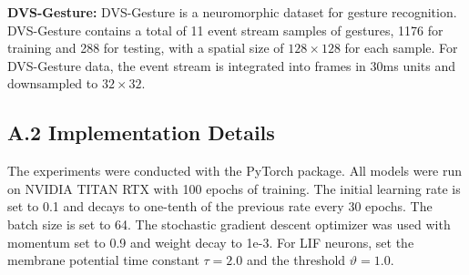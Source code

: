 \documentclass[letterpaper]{article} %
\begin{document}
\textbf{DVS-Gesture:} DVS-Gesture \cite{DVS-Gesture} is a neuromorphic dataset for gesture recognition. DVS-Gesture contains a total of 11 event stream samples of gestures, 1176 for training and 288 for testing, with a spatial size of $128 \times 128$ for each sample. For DVS-Gesture data, the event stream is integrated into frames in 30ms units and downsampled to $32 \times 32$.

\subsection{A.2 Implementation Details}
The experiments were conducted with the PyTorch package. All models were run on NVIDIA TITAN RTX with 100 epochs of training. The initial learning rate is set to 0.1 and decays to one-tenth of the previous rate every 30 epochs. The batch size is set to 64. The stochastic gradient descent optimizer was used with momentum set to 0.9 and weight decay to 1e-3. For LIF neurons, set the membrane potential time constant $\tau = 2.0$ and the threshold $\vartheta = 1.0$.
\end{document}
